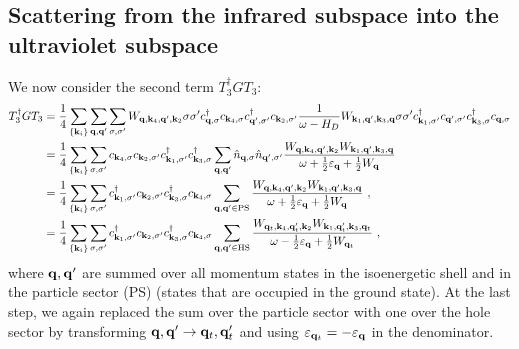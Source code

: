 \documentclass{revtex4-2}
\begin{document}
\subsection{Scattering from the infrared subspace into the ultraviolet subspace}
We now consider the second term \(T_3^\dagger G T_3\):
\begin{equation}\begin{aligned}
	T_3^\dagger G T_3 &= \frac{1}{4}\sum_{\left\{ {\bf k}_i \right\} }\sum_{{\bf q},{\bf q}^\prime}\sum_{\sigma,\sigma^\prime} W_{{\bf q},{\bf k}_4, {\bf q}^\prime, {\bf k}_2} \sigma\sigma^\prime c^\dagger_{{\bf q},\sigma}c_{{\bf k}_4,\sigma}c^\dagger_{{\bf q}^\prime,\sigma^\prime}c_{{\bf k}_2,\sigma^\prime} \frac{1}{\omega - H_D} W_{{\bf k}_1,{\bf q}^\prime, {\bf k}_3, {\bf q}} \sigma\sigma^\prime c^\dagger_{{\bf k}_1,\sigma^\prime} c_{{\bf q}^\prime,\sigma^\prime} c^\dagger_{{\bf k}_3,\sigma} c_{{\bf q},\sigma}\\
			  &= \frac{1}{4}\sum_{\left\{ {\bf k}_i \right\}}\sum_{\sigma,\sigma^\prime}   c_{{\bf k}_4,\sigma} c_{{\bf k}_2,\sigma^\prime} c^\dagger_{{\bf k}_1,\sigma^\prime} c^\dagger_{{\bf k}_3,\sigma} \sum_{{\bf q},{\bf q}^\prime}\hat n_{{\bf q},\sigma} \hat n_{{\bf q}^\prime,\sigma^\prime}\frac{W_{{\bf q},{\bf k}_4, {\bf q}^\prime, {\bf k}_2} W_{{\bf k}_1,{\bf q}^\prime, {\bf k}_3, {\bf q}}}{\omega + \frac{1}{2}\varepsilon_{{\bf q}} + \frac{1}{2}W_{{\bf q}}}\\
			  &= \frac{1}{4}\sum_{\left\{ {\bf k}_i \right\}}\sum_{\sigma,\sigma^\prime} c^\dagger_{{\bf k}_1,\sigma^\prime} c_{{\bf k}_2,\sigma^\prime} c^\dagger_{{\bf k}_3,\sigma}c_{{\bf k}_4,\sigma}  \sum_{{\bf q}, {\bf q}^\prime \in \text{PS}}\frac{W_{{\bf q},{\bf k}_4, {\bf q}^\prime, {\bf k}_2} W_{{\bf k}_1,{\bf q}^\prime, {\bf k}_3, {\bf q}}}{\omega + \frac{1}{2}\varepsilon_{{\bf q}} + \frac{1}{2}W_{{\bf q}}}~,\\
			  &= \frac{1}{4}\sum_{\left\{ {\bf k}_i \right\}}\sum_{\sigma,\sigma^\prime} c^\dagger_{{\bf k}_1,\sigma^\prime} c_{{\bf k}_2,\sigma^\prime} c^\dagger_{{\bf k}_3,\sigma}c_{{\bf k}_4,\sigma}  \sum_{{\bf q}, {\bf q}^\prime \in \text{HS}}\frac{W_{{\bf q}_t,{\bf k}_4, {\bf q}_t^\prime, {\bf k}_2} W_{{\bf k}_1,{\bf q}_t^\prime, {\bf k}_3, {\bf q}_t}}{\omega - \frac{1}{2}\varepsilon_{{\bf q}} + \frac{1}{2}W_{{\bf q}_t}}~,
\end{aligned}\end{equation}
where \({\bf q}, {\bf q}^\prime\) are summed over all momentum states in the isoenergetic shell and in the particle sector (PS) (states that are occupied in the ground state). At the last step, we again replaced the sum over the particle sector with one over the hole sector by transforming \({\bf q},{{\bf q}^\prime} \to {\bf q}_t,{\bf q}_t^\prime\) and using \(\varepsilon_{{\bf q}_t} = -\varepsilon_{{\bf q}}\) in the denominator.
\end{document}
